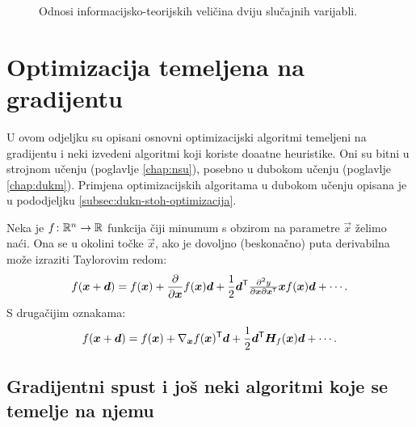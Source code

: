 \documentclass[utf8, diplomski, lmodern]{fer}
\begin{document}
\begin{figure}
\centering
{}
\caption{Odnosi informacijsko-teorijskih veličina dviju slučajnih varijabli.}
\label{fig:entropije}
\end{figure}


\section{Optimizacija temeljena na gradijentu}

U ovom odjeljku su opisani osnovni optimizacijski algoritmi temeljeni na gradijentu i neki izvedeni algoritmi koji koriste doaatne heuristike. Oni su bitni u strojnom učenju (poglavlje \ref{chap:nsu}), posebno u dubokom učenju (poglavlje \ref{chap:dukm}). Primjena optimizacijskih algoritama u dubokom učenju opisana je u pododjeljku \ref{subsec:dukn-stoh-optimizacija}.

Neka je $f \colon \mathbb{R}^n \to \mathbb{R}$ funkcija čiji minumum s obzirom na parametre $\vec x$ želimo naći. Ona se u okolini točke $\vec x$, ako je dovoljno (beskonačno) puta derivabilna može izraziti Taylorovim redom:
\begin{align}
f(\vec x+\vec d) = f(\vec x) + \pd{}{\vec x}f(\vec x)\vec d + \frac{1}{2}\vec d^\tp{\tfrac{\partial^2y}{\partial\vec x\partial\vec x^\tp}}{\vec x}f(\vec x)\vec d + \cdots \text{.}
\end{align}
S drugačijim oznakama:
\begin{align} \label{eq:taylorov-red}
f(\vec x+\vec d) = f(\vec x) + \nabla_{\vec x}f(\vec x)^\tp\vec d + \frac{1}{2}\vec d^\tp\vec H_f(\vec x)\vec d + \cdots \text{.}
\end{align}

\subsection{Gradijentni spust i još neki algoritmi koje se temelje na njemu} \label{subsec:gradijenti-spust}
\end{document}

